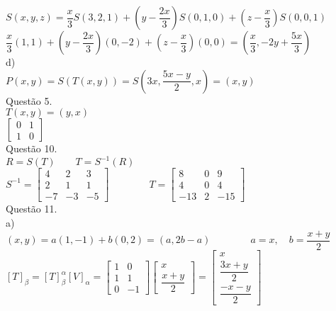 \documentclass[12pt]{article}
\begin{document}
$S(x,y,z)=\dfrac{x}{3}S(3,2,1)+(y-\dfrac{2x}{3})S(0,1,0)+(z-\dfrac{x}{3})S(0,0,1)$\\

$\dfrac{x}{3}(1,1)+(y-\dfrac{2x}{3})(0,-2)+(z-\dfrac{x}{3})(0,0)=(\dfrac{x}{3},-2y+\dfrac{5x}{3})$\\

\noindent d)\\

$P(x,y)=S(T(x,y))=S(3x,\dfrac{5x-y}{2},x)=(x,y)$\\

\noindent Questão 5.\\

$T(x,y)=(y,x)$\\

$\begin{bmatrix}0&1\\1&0\end{bmatrix}$\\

\noindent Questão 10.\\

$R=S(T)\qquad T=S^{-1}(R)$\\

$S^{-1}=\begin{bmatrix}4&2&3\\2&1&1\\-7&-3&-5\end{bmatrix}\qquad\qquad T=\begin{bmatrix}8&0&9\\4&0&4\\-13&2&-15\end{bmatrix}$\\

\noindent Questão 11.\\

\noindent a)\\

$(x,y)=a(1,-1)+b(0,2)=(a,2b-a)\qquad\qquad a=x,\quad b=\dfrac{x+y}{2}$\\

$[T]_{\beta}=[T]_{\beta}^{\alpha}[V]_{\alpha}=\begin{bmatrix}1&0\\1&1\\0&-1\end{bmatrix}\begin{bmatrix}x\\\dfrac{x+y}{2}\end{bmatrix}=\begin{bmatrix}x\\\dfrac{3x+y}{2}\\\dfrac{-x-y}{2}\end{bmatrix}$\\
	
\end{document}
